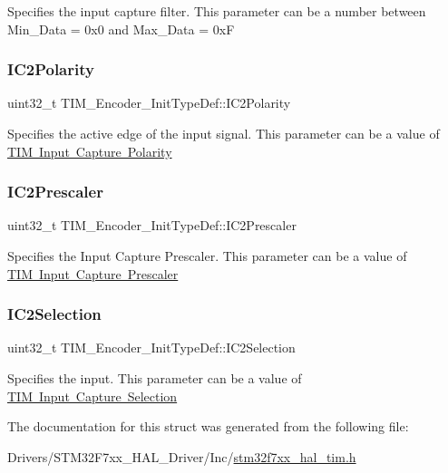 Specifies the input capture filter. This parameter can be a number between Min\+\_\+\+Data = 0x0 and Max\+\_\+\+Data = 0xF \mbox{\label{struct_t_i_m___encoder___init_type_def_abb7968a8ba34e13da1fb8f5916a754ce}} 
\subsubsection{\texorpdfstring{IC2Polarity}{IC2Polarity}}
{\footnotesize\ttfamily uint32\+\_\+t T\+I\+M\+\_\+\+Encoder\+\_\+\+Init\+Type\+Def\+::\+I\+C2\+Polarity}

Specifies the active edge of the input signal. This parameter can be a value of \mbox{\hyperlink{group___t_i_m___input___capture___polarity}{T\+IM Input Capture Polarity}} \mbox{\label{struct_t_i_m___encoder___init_type_def_ac80972d0e157508ff075815da58070cb}} 
\subsubsection{\texorpdfstring{IC2Prescaler}{IC2Prescaler}}
{\footnotesize\ttfamily uint32\+\_\+t T\+I\+M\+\_\+\+Encoder\+\_\+\+Init\+Type\+Def\+::\+I\+C2\+Prescaler}

Specifies the Input Capture Prescaler. This parameter can be a value of \mbox{\hyperlink{group___t_i_m___input___capture___prescaler}{T\+IM Input Capture Prescaler}} \mbox{\label{struct_t_i_m___encoder___init_type_def_a84a39a8667f296b4b3fbe1a0add58396}} 
\subsubsection{\texorpdfstring{IC2Selection}{IC2Selection}}
{\footnotesize\ttfamily uint32\+\_\+t T\+I\+M\+\_\+\+Encoder\+\_\+\+Init\+Type\+Def\+::\+I\+C2\+Selection}

Specifies the input. This parameter can be a value of \mbox{\hyperlink{group___t_i_m___input___capture___selection}{T\+IM Input Capture Selection}} 

The documentation for this struct was generated from the following file\+:\begin{DoxyCompactItemize}
\item 
Drivers/\+S\+T\+M32\+F7xx\+\_\+\+H\+A\+L\+\_\+\+Driver/\+Inc/\mbox{\hyperlink{stm32f7xx__hal__tim_8h}{stm32f7xx\+\_\+hal\+\_\+tim.\+h}}\end{DoxyCompactItemize}
